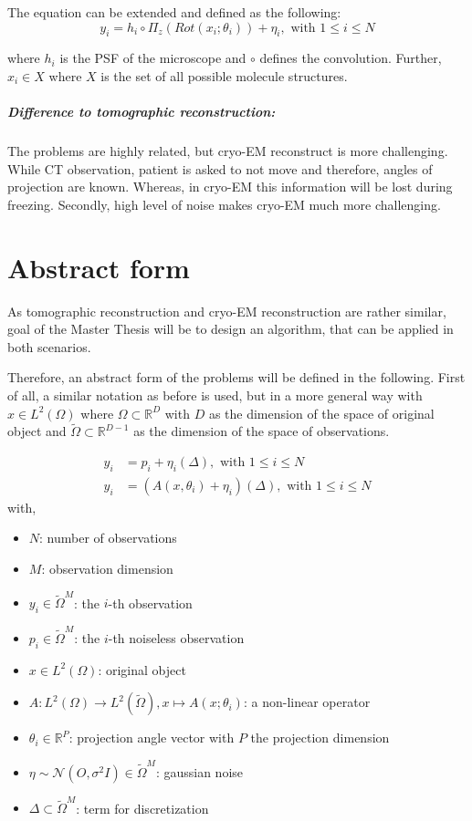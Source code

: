 The equation can be extended and defined as the following:
\begin{equation}
    \label{eq:cryoEmExtended}
    y_i = h_i \circ \Pi_z ( Rot (x_i; \theta_i)) + \eta_i, \text{ with } 1 \leq i \leq N
\end{equation}

where $h_i$ is the PSF of the microscope and $\circ$ defines the convolution.
Further, $x_i \in X$ where $X$ is the set of all possible molecule structures.


\subparagraph{Difference to tomographic reconstruction:}
The problems are highly related, but cryo-EM reconstruct is more challenging.
While CT observation, patient is asked to not move and therefore, angles of projection are known.
Whereas, in cryo-EM this information will be lost during freezing.
Secondly, high level of noise makes cryo-EM much more challenging.


\section{Abstract form}
As tomographic reconstruction and cryo-EM reconstruction are rather similar, 
goal of the Master Thesis will be to design an algorithm, that can be applied in both scenarios.

Therefore, an abstract form of the problems will be defined in the following.
First of all, a similar notation as before is used, but in a more general way with
$x \in L^2(\Omega)$ where $\Omega \subset \mathbb{R}^D$ with $D$ as the dimension of the space of original object
and $\tilde{\Omega} \subset \mathbb{R}^{D-1}$ as the dimension of the space of observations.


\begin{equation}
    \begin{aligned}
        y_i &= p_i + \eta_i (\Delta), \text{ with } 1 \leq i \leq N \\
        y_i &= \left( A(x, \theta_i) + \eta_i \right) (\Delta), \text{ with } 1 \leq i \leq N 
    \end{aligned}
\end{equation}
with, 
\begin{itemize}
    \item $N$: number of observations
    \item $M$: observation dimension
    \item $y_i \in \tilde{\Omega}^M$: the $i$-th observation
    \item $p_i \in \tilde{\Omega}^M$: the $i$-th noiseless observation
    \item $x \in L^2(\Omega)$: original object
    \item $A: L^2(\Omega) \to L^2(\tilde{\Omega}), x \mapsto A(x; \theta_i)$: a non-linear operator 
    \item $\theta_i \in \mathbb{R}^P$: projection angle vector with $P$ the projection dimension
    \item $\eta \sim \mathcal{N}(O, \sigma^2 I) \in \tilde{\Omega}^M$: gaussian noise
    \item $\Delta \subset \tilde{\Omega}^{M}$: term for discretization
\end{itemize}

